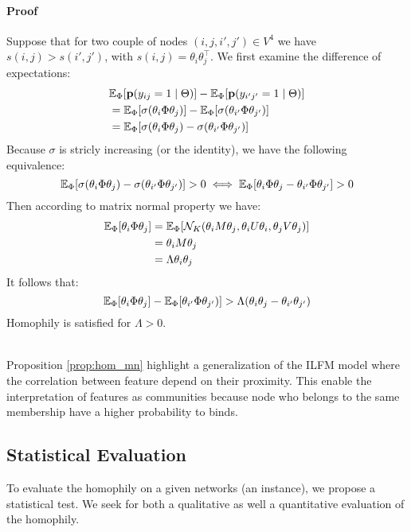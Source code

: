 \paragraph{Proof} 
Suppose that for two couple of nodes $(i,j,i',j') \in V^4$ we have $s(i,j) > s(i',j')$, with $s(i,j) =\theta_i \theta_j^\top$. We first examine the difference of expectations:
\begin{align}
&\mathbb{E}_{\Phi}[\mathbf{p}(y_{ij}=1\mid \Theta)] - \mathbb{E}_{\Phi}[\mathbf{p}(y_{i'j'}=1\mid \Theta)] \\
&= \mathbb{E}_{\Phi}[\sigma(\theta_i \Phi \theta_j)] -  \mathbb{E}_{\Phi}[\sigma(\theta_{i'} \Phi \theta_{j'})] \\
&= \mathbb{E}_{\Phi}[\sigma(\theta_i \Phi \theta_j) - \sigma(\theta_{i'} \Phi \theta_{j'})]
\end{align}
Because $\sigma$ is stricly increasing (or the identity), we have the following equivalence:
\begin{equation}
\mathbb{E}_{\Phi}[\sigma(\theta_i \Phi \theta_j) - \sigma(\theta_{i'} \Phi \theta_{j'})] > 0  \iff \mathbb{E}_{\Phi}[\theta_i \Phi \theta_j - \theta_{i'} \Phi \theta_{j'}] > 0 
\end{equation}
Then according to matrix normal property we have:
\begin{align}
\mathbb{E}_{\Phi}[\theta_i \Phi \theta_j] &= \mathbb{E}_{\Phi}[\mathcal{N}_K(\theta_iM\theta_j, \theta_iU\theta_i, \theta_jV\theta_j)] \\
&= \theta_iM\theta_j \\
&= \Lambda \theta_i \theta_j
\end{align}
It follows that:  
\begin{equation}
\mathbb{E}_{\Phi}[\theta_i \Phi \theta_j] - \mathbb{E}_{\Phi}[\theta_{i'} \Phi \theta_{j'})] > \Lambda (\theta_i \theta_j - \theta_{i'} \theta_{j'} )
\end{equation}
Homophily is satisfied for $\Lambda > 0$.

~\\

Proposition \ref{prop:hom_mn} highlight a generalization of the ILFM model where the correlation between feature depend on their proximity. This enable the interpretation of features as communities because node who belongs to the same membership have a higher probability to binds.


\subsection{Statistical Evaluation}
To evaluate the homophily on a given networks (an instance), we propose a statistical test. We seek for both a qualitative as well a quantitative evaluation of the homophily.


